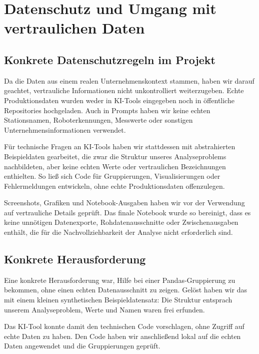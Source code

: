 \documentclass[a4paper, 11pt]{article}
\begin{document}
\section{Datenschutz und Umgang mit vertraulichen Daten}

\subsection{Konkrete Datenschutzregeln im Projekt}

Da die Daten aus einem realen Unternehmenskontext stammen, haben wir darauf geachtet, vertrauliche Informationen nicht unkontrolliert weiterzugeben. Echte Produktionsdaten wurden weder in KI-Tools eingegeben noch in öffentliche Repositories hochgeladen. Auch in Prompts haben wir keine echten Stationsnamen, Roboterkennungen, Messwerte oder sonstigen Unternehmensinformationen verwendet.

Für technische Fragen an KI-Tools haben wir stattdessen mit abstrahierten Beispieldaten gearbeitet, die zwar die Struktur unseres Analyseproblems nachbildeten, aber keine echten Werte oder vertraulichen Bezeichnungen enthielten. So ließ sich Code für Gruppierungen, Visualisierungen oder Fehlermeldungen entwickeln, ohne echte Produktionsdaten offenzulegen.

Screenshots, Grafiken und Notebook-Ausgaben haben wir vor der Verwendung auf vertrauliche Details geprüft. Das finale Notebook wurde so bereinigt, dass es keine unnötigen Datenexporte, Rohdatenausschnitte oder Zwischenausgaben enthält, die für die Nachvollziehbarkeit der Analyse nicht erforderlich sind.

\subsection{Konkrete Herausforderung}

Eine konkrete Herausforderung war, Hilfe bei einer Pandas-Gruppierung zu bekommen, ohne einen echten Datenausschnitt zu zeigen. Gelöst haben wir das mit einem kleinen synthetischen Beispieldatensatz: Die Struktur entsprach unserem Analyseproblem, Werte und Namen waren frei erfunden.

Das KI-Tool konnte damit den technischen Code vorschlagen, ohne Zugriff auf echte Daten zu haben. Den Code haben wir anschließend lokal auf die echten Daten angewendet und die Gruppierungen geprüft.
\end{document}

